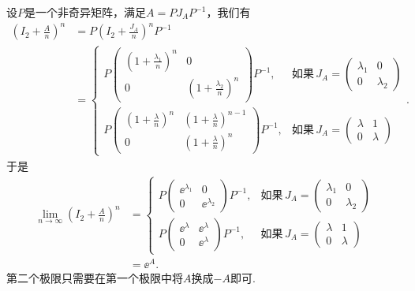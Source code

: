 \begin{solution}
  设$P$是一个非奇异矩阵，满足$A=PJ_AP^{-1}$，我们有
  \begin{align*}
    \left( I_2 + \frac An \right)^n & = P \left( I_2 + \frac {J_A}n \right)^n P^{-1} \\
    & = \begin{cases}
      P \begin{pmatrix}
        \left(1+\frac{\lambda_1}n\right)^n & 0 \\
        0 & \left(1+\frac{\lambda_2}n\right)^n
        \end{pmatrix}
        P^{-1}, & \text{如果}\, J_A = \begin{pmatrix}
          \lambda_1 & 0 \\
          0 & \lambda_2
        \end{pmatrix} \\
        P \begin{pmatrix}
        \left(1+\frac{\lambda}n\right)^n & \left(1+\frac{\lambda}n\right)^{n-1} \\
        0 & \left(1+\frac{\lambda}n\right)^n
        \end{pmatrix} P^{-1} ,& \text{如果}\,
        J_A = \begin{pmatrix}
          \lambda & 1 \\
          0 & \lambda
        \end{pmatrix}
    \end{cases}.
  \end{align*}
  于是
  \begin{align*}
    \lim_{n\to\infty} \left( I_2 + \frac An \right)^n & = \begin{cases}
      P \begin{pmatrix}
        \ee^{\lambda_1} & 0 \\
        0 & \ee^{\lambda_2}
      \end{pmatrix}P^{-1}, & \text{如果}\, J_A = \begin{pmatrix}
        \lambda_1 & 0 \\
        0 & \lambda_2
      \end{pmatrix} \\
      P \begin{pmatrix}
        \ee^\lambda & \ee^\lambda \\
        0 & \ee^\lambda
      \end{pmatrix} P^{-1}, & \text{如果}\, J_A = \begin{pmatrix}
        \lambda & 1 \\
        0 & \lambda
      \end{pmatrix}
    \end{cases} \\
    & = \ee^A.
  \end{align*}
  第二个极限只需要在第一个极限中将$A$换成$-A$即可.
\end{solution}

